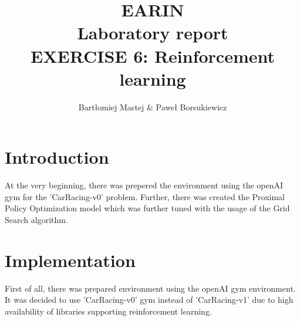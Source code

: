 \documentclass[runningheads]{llncs}
\begin{document}
%
\title{EARIN\\Laboratory report\\EXERCISE 6: Reinforcement learning}
%
\author{Bartłomiej Mastej \& Paweł Borsukiewicz}
%

%
\maketitle              %
%
%
%
%
\section{Introduction}
At the very beginning, there was prepered the environment using the openAI gym for the 'CarRacing-v0' problem. Further, there was created the Proximal Policy Optimization model which was further tuned with the usage of the Grid Search algorithm.
\section{Implementation}
First of all, there was prepared environment using the openAI gym environment. It was decided to use 'CarRacing-v0' gym instead of 'CarRacing-v1' due to high availability of libraries supporting reinforcement learning.
\end{document}
